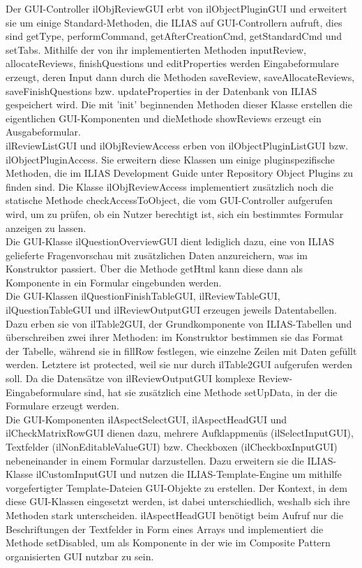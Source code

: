 \documentclass[a4paper]{scrreprt}
\begin{document}
Der GUI-Controller ilObjReviewGUI erbt von ilObjectPluginGUI und erweitert sie um einige Standard-Methoden, die ILIAS auf GUI-Controllern aufruft, dies sind getType, performCommand, getAfterCreationCmd, getStandardCmd und setTabs. Mithilfe der von ihr implementierten Methoden inputReview, allocateReviews, finishQuestions und editProperties werden Eingabeformulare erzeugt, deren Input dann durch die Methoden saveReview, saveAllocateReviews, saveFinishQuestions bzw. updateProperties in der Datenbank von ILIAS gespeichert wird. Die mit 'init' beginnenden Methoden dieser Klasse erstellen die eigentlichen GUI-Komponenten und dieMethode showReviews erzeugt ein Ausgabeformular.\\
ilReviewListGUI und ilObjReviewAccess erben von ilObjectPluginListGUI bzw. ilObjectPluginAccess. Sie erweitern diese Klassen um einige pluginspezifische Methoden, die im ILIAS Development Guide unter Repository Object Plugins
zu finden sind. Die Klasse ilObjReviewAccess implementiert zusätzlich noch die statische Methode checkAccessToObject, die vom GUI-Controller aufgerufen wird, um zu prüfen, ob ein Nutzer berechtigt ist, sich ein bestimmtes Formular anzeigen zu lassen.\\
Die GUI-Klasse ilQuestionOverviewGUI dient lediglich dazu, eine von ILIAS gelieferte Fragenvorschau mit zusätzlichen Daten anzureichern, was im Konstruktor passiert. Über die Methode getHtml kann diese dann als Komponente in ein Formular eingebunden werden.\\
Die GUI-Klassen ilQuestionFinishTableGUI, ilReviewTableGUI, ilQuestionTableGUI und ilReviewOutputGUI erzeugen jeweils Datentabellen. Dazu erben sie von ilTable2GUI, der Grundkomponente von ILIAS-Tabellen und überschreiben zwei ihrer Methoden: im Konstruktor bestimmen sie das Format der Tabelle, während sie in fillRow festlegen, wie einzelne Zeilen mit Daten gefüllt werden. Letztere ist protected, weil sie nur durch ilTable2GUI aufgerufen werden soll. Da die Datensätze von ilReviewOutputGUI komplexe Review-Eingabeformulare sind, hat sie zusätzlich eine Methode setUpData, in der die Formulare erzeugt werden.\\
Die GUI-Komponenten ilAspectSelectGUI, ilAspectHeadGUI und ilCheckMatrixRowGUI dienen dazu, mehrere Aufklappmenüs (ilSelectInputGUI), Textfelder (ilNonEditableValueGUI) bzw. Checkboxen (ilCheckboxInputGUI) nebeneinander in einem Formular darzustellen. Dazu erweitern sie die ILIAS-Klasse ilCustomInputGUI und nutzen die ILIAS-Template-Engine um mithilfe vorgefertigter Template-Dateien GUI-Objekte zu erstellen. Der Kontext, in dem diese GUI-Klassen eingesetzt werden, ist dabei unterschiedlich, weshalb sich ihre Methoden stark unterscheiden. ilAspectHeadGUI benötigt beim Aufruf nur die Beschriftungen der Textfelder in Form eines Arrays und implementiert die Methode setDisabled, um als Komponente in der wie im Composite Pattern organisierten GUI nutzbar zu sein.
\end{document}
